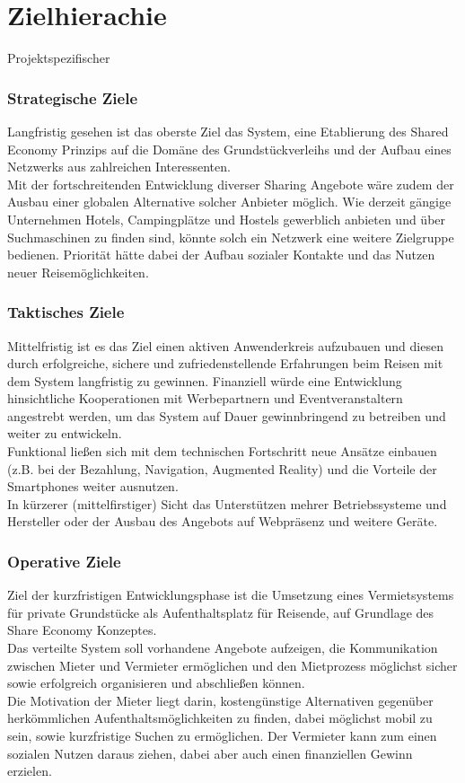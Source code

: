 
\section{Zielhierachie}
Projektspezifischer

\subsubsection{Strategische Ziele}
Langfristig gesehen ist das oberste Ziel das System, eine Etablierung des Shared Economy Prinzips auf die Domäne des Grundstückverleihs und der Aufbau eines Netzwerks aus zahlreichen Interessenten.\\
Mit der fortschreitenden Entwicklung diverser Sharing Angebote wäre zudem der Ausbau einer globalen Alternative solcher Anbieter möglich. Wie derzeit gängige Unternehmen Hotels, Campingplätze und Hostels gewerblich anbieten und über Suchmaschinen zu finden sind, könnte solch ein Netzwerk eine weitere Zielgruppe bedienen. Priorität hätte dabei der Aufbau sozialer Kontakte und das Nutzen neuer Reisemöglichkeiten.


\subsubsection{Taktisches Ziele}
Mittelfristig ist es das Ziel einen aktiven Anwenderkreis aufzubauen und diesen durch erfolgreiche, sichere und zufriedenstellende Erfahrungen beim Reisen mit dem System langfristig zu gewinnen.
Finanziell würde eine Entwicklung hinsichtliche Kooperationen mit Werbepartnern und Eventveranstaltern angestrebt werden, um das System auf Dauer gewinnbringend zu betreiben und weiter zu entwickeln. \\
Funktional ließen sich mit dem technischen Fortschritt neue Ansätze einbauen (z.B. bei der Bezahlung, Navigation, Augmented Reality) und die Vorteile der Smartphones weiter ausnutzen. \\
In kürzerer (mittelfirstiger) Sicht das Unterstützen mehrer Betriebssysteme und Hersteller oder der Ausbau des Angebots auf Webpräsenz und weitere Geräte.


\subsubsection{Operative Ziele}
Ziel der kurzfristigen Entwicklungsphase ist die Umsetzung eines Vermietsystems für private Grundstücke als Aufenthaltsplatz für Reisende, auf Grundlage des Share Economy Konzeptes.\\
Das verteilte System soll vorhandene Angebote aufzeigen, die Kommunikation zwischen Mieter und Vermieter ermöglichen und den Mietprozess möglichst sicher sowie erfolgreich organisieren und abschließen können.\\
Die Motivation der Mieter liegt darin, kostengünstige Alternativen gegenüber herkömmlichen Aufenthaltsmöglichkeiten zu finden, dabei möglichst mobil zu sein, sowie kurzfristige Suchen zu ermöglichen. Der Vermieter kann zum einen sozialen Nutzen daraus ziehen, dabei aber auch einen finanziellen Gewinn erzielen. 


